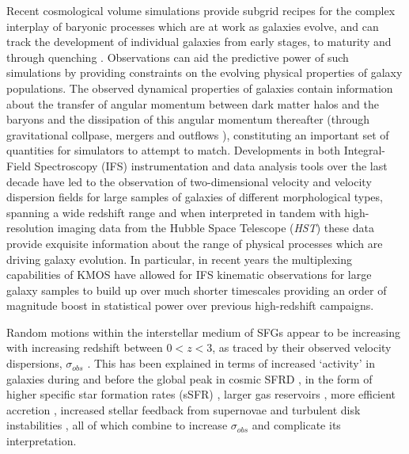 \documentclass[fleqn,usenatbib]{mn2e}
\begin{document}
Recent cosmological volume simulations provide subgrid recipes for the complex interplay of baryonic processes which are at work as galaxies evolve, and can track the development of individual galaxies from early stages, to maturity and through quenching \citep{Dubois2014a,Vogelsberger2014b,Schaye2015}.
Observations can aid the predictive power of such simulations by providing constraints on the evolving physical properties of galaxy populations.
The observed dynamical properties of galaxies contain information about the transfer of angular momentum between dark matter halos and the baryons and the dissipation of this angular momentum thereafter (through gravitational collpase, mergers and outflows \citealt{Fall1983,Romanowsky2012,Fall2013}), constituting an important set of quantities for simulators to attempt to match.
Developments in both Integral-Field Spectroscopy (IFS) instrumentation and data analysis tools over the last decade have led to the observation of two-dimensional velocity and velocity dispersion fields for large samples of galaxies of different morphological types, spanning a wide redshift range \citep[e.g.][]{Sarzi2005,Flores2006,Epinat2008,ForsterSchreiber2009,Cappellari2011,Gnerucci2011,Epinat2012,Croom2012,Swinbank2012,Swinbank2012a,Bundy2015,Wisnioski2015,Stott2016,Harrison2017,Swinbank2017} and when interpreted in tandem with high-resolution imaging data from the Hubble Space Telescope ({\em {\em HST}}) these data provide exquisite information about the range of physical processes which are driving galaxy evolution.
In particular, in recent years the multiplexing capabilities of KMOS \citep{Sharples2013} have allowed for IFS kinematic observations for large galaxy samples to build up over much shorter timescales \citep{Sobral2013,Wisnioski2015,Stott2016,Mason2016,Harrison2017} providing an order of magnitude boost in statistical power over previous high-redshift campaigns.    

Random motions within the interstellar medium of SFGs appear to be increasing with increasing redshift between $0 < z < 3$, as traced by their observed velocity dispersions, $\sigma_{obs}$ \citep{Genzel2008,ForsterSchreiber2009,Law2009,Cresci2009,Gnerucci2011,Epinat2012,Kassin2012,Green2014,Wisnioski2015,Stott2016}.
This has been explained in terms of increased `activity' in galaxies during and before the global peak in cosmic SFRD \citep{Madau_2014}, in the form of higher specific star formation rates (sSFR) \citep{Wisnioski2015}, larger gas reservoirs \citep{Law2009,ForsterSchreiber2009,Wisnioski2015,Stott2016}, more efficient accretion \citep{Law2009}, increased stellar feedback from supernovae \citep{Kassin2012} and turbulent disk instabilities \citep{Law2009,Bournaud2007,Bournaud2016}, all of which combine to increase $\sigma_{obs}$ and complicate its interpretation.
\end{document}
